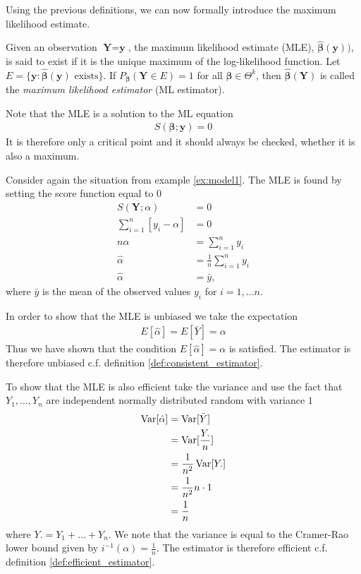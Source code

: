 Using the previous definitions, we can now formally introduce the maximum likelihood estimate. 

\begin{definition} 
\label{def:MLE}
Given an observation $\textbf{Y}=\textbf{y}$, the maximum likelihood estimate (MLE), $\hat{\boldsymbol{\beta}}(\textbf{y}))$, is said to exist if it is the unique maximum of the log-likelihood function. 
Let $E = \{ \textbf{y} : \hat{\boldsymbol{\beta}}(\textbf{y}) \text{ exists} \}$. If $P_{\boldsymbol{\beta}}(\textbf{Y} \in E) = 1$ for all $\boldsymbol{\beta} \in \Theta^k$, then $\hat{\boldsymbol{\beta}}(\textbf{Y})$ is called the \textit{maximum likelihood estimator} (ML estimator).
\end{definition}
Note that the MLE is a solution to the ML equation
\begin{align*}
    S(\boldsymbol{\beta}; \textbf{y}) = 0
\end{align*}
It is therefore only a critical point and it should always be checked, whether it is also a maximum. 

\begin{example}
Consider again the situation from example \ref{ex:model1}. The MLE is found by setting the score function equal to $0$
\begin{align*}
    S\left(\textbf{Y}; \alpha \right) &= 0\\
    \sum_{i=1}^n \left[y_i - \alpha \right]&= 0\\
    n\alpha &= \sum_{i=1}^n y_i\\
    \hat{\alpha} &= \frac{1}{n} \sum_{i=1}^n y_i \\
    \hat{\alpha} &= \bar{y},
\end{align*}
where $\bar{y}$ is the mean of the observed values $y_i$ for $i = 1, \ldots n$.

In order to show that the MLE is unbiased we take the expectation
\begin{align*}
    E[\hat{\alpha}]=E[\bar{Y}]=\alpha
\end{align*}
Thus we have shown that the condition $E[\hat{\alpha}] = \alpha$ is satisfied. The estimator is therefore unbiased c.f. definition \ref{def:consistent_estimator}.

To show that the MLE is also efficient take the variance and use the fact that $Y_1,\ldots,Y_n$ are independent normally distributed random with variance $1$
\begin{align*}
\operatorname{\text{Var}}[\hat{\alpha}]&=\operatorname{\text{Var}}[\bar{Y}] \\
&=\operatorname{\text{Var}}[\frac{Y.}{n}] \\
&=\frac{1}{n^2}\operatorname{\text{Var}}[Y.] \\
&= \frac{1}{n^2}n \cdot 1 \\
&= \frac{1}{n}
\end{align*}
where $Y.=Y_1 + \ldots + Y_n$.
We note that the variance is equal to the Cramer-Rao lower bound given by $i^{-1}(\alpha)=\frac{1}{n}$. The estimator is therefore efficient c.f. definition \ref{def:efficient_estimator}.
\end{example}

